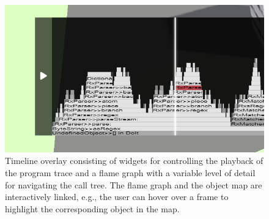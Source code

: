 \begin{figure}
	\includegraphics[width=\linewidth]{sections/03_visualization_approach/mapping/timeline}
	\caption{
		Timeline overlay consisting of widgets for controlling the playback of the program trace and a flame graph with a variable level of detail for navigating the call tree.
		The flame graph and the object map are interactively linked, e.g., the user can hover over a frame to highlight the corresponding object in the map.
	}
	\label{fig:visualization_approach/mapping/timeline}
\end{figure}

